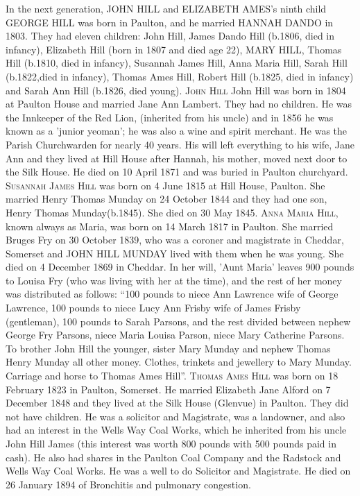 In the next generation, \uppercase{John Hill} and \uppercase{Elizabeth Ames}'s ninth child \uppercase{George Hill} was born in Paulton, and he married \uppercase{Hannah Dando} in 1803. They had eleven children: John Hill, James Dando Hill (b.1806, died in infancy), Elizabeth Hill (born in 1807 and died age 22), \uppercase{Mary Hill}, Thomas Hill (b.1810, died in infancy), Susannah James Hill, Anna Maria Hill, Sarah Hill (b.1822,died in infancy), Thomas Ames Hill, Robert Hill (b.1825, died in infancy) and Sarah Ann Hill (b.1826, died young). 
\textsc{John Hill} John Hill was born in 1804 at Paulton House and married Jane Ann Lambert. They had no children. He was the Innkeeper of the Red Lion, (inherited from his uncle) and in 1856 he was known as a 'junior yeoman'; he was also a wine and spirit merchant. He was the Parish Churchwarden for nearly 40 years. His will left everything to his wife, Jane Ann and they lived at Hill House after Hannah, his mother, moved next door to the Silk House. He died on 10 April 1871 and was buried in Paulton churchyard.
\textsc{Susannah James Hill} was born on 4 June 1815 at Hill House, Paulton. She married Henry Thomas Munday on 24 October 1844 and they had one son, Henry Thomas Munday(b.1845). She died on 30 May 1845.
\textsc{Anna Maria Hill}, known always as Maria, was born on 14 March 1817 in Paulton. She married Bruges Fry on 30 October 1839, who was a coroner and magistrate in Cheddar, Somerset and \uppercase{John Hill Munday} lived with them when he was young. She died on 4 December 1869 in Cheddar.  In her will, 'Aunt Maria' leaves 900 pounds to Louisa Fry (who was living with her at the time), and the rest of her money was distributed as follows: ``100 pounds to niece Ann Lawrence wife of George Lawrence, 100 pounds to niece Lucy Ann Frisby wife of James Frisby (gentleman), 100 pounds to Sarah Parsons, and the rest  divided between nephew George Fry Parsons, niece Maria Louisa Parson, niece Mary Catherine Parsons. To brother John Hill the younger, sister Mary Munday and nephew Thomas Henry Munday all other money. Clothes, trinkets and jewellery to Mary Munday. Carriage and horse to Thomas Ames Hill''.
\textsc{Thomas Ames Hill} was born on 18 February 1823 in Paulton, Somerset.  He married Elizabeth Jane Alford on 7 December 1848 and they lived at the Silk House (Glenvue) in Paulton. They did not have children. He was a solicitor and Magistrate, was a landowner, and also had an interest in the Wells Way Coal Works, which he inherited from his uncle John Hill James (this interest was worth 800 pounds with 500 pounds paid in cash). He also had shares in the Paulton Coal Company and the Radstock and Wells Way Coal Works.  He was a well to do Solicitor and Magistrate.  He died on 26 January 1894 of Bronchitis and pulmonary congestion.
















